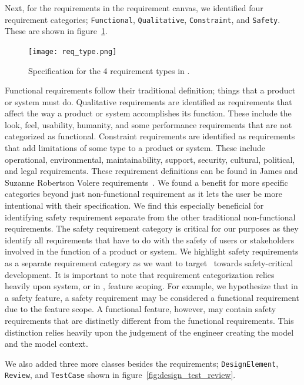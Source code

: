 Next, for the requirements in the requirement canvas, we identified four requirement categories; \texttt{Functional}, \texttt{Qualitative}, \texttt{Constraint}, and \texttt{Safety}. These are shown in figure~\ref{fig:req_type}.

\begin{figure}[hbt!]
	\centering
	\texttt{[image: req\_type.png]}
	\caption{Specification for the 4 requirement types in \tool.}
	\label{fig:req_type}
\end{figure}

Functional requirements follow their traditional definition; things that a product or system must do. Qualitative requirements are identified as requirements that affect the way a product or system accomplishes its function. These include the look, feel, usability, humanity, and some performance requirements that are not categorized as functional. Constraint requirements are identified as requirements that add limitations of some type to a product or system. These include operational, environmental, maintainability, support, security, cultural, political, and legal requirements. These requirement definitions can be found in James and Suzanne Robertson Volere requirements~\cite{robertson2000volere}. We found a benefit for more specific categories beyond just non-functional requirement as it lets the user be more intentional with their specification. We find this especially beneficial for identifying safety requirement separate from the other traditional non-functional requirements. The safety requirement category is critical for our purposes as they identify all requirements that have to do with the safety of users or stakeholders involved in the function of a product or system. We highlight safety requirements as a separate requirement category as we want to target \tool\ towards safety-critical development. It is important to note that requirement categorization relies heavily upon system, or in \tool, feature scoping. For example, we hypothesize that in a safety feature, a safety requirement may be considered a functional requirement due to the feature scope. A functional feature, however, may contain safety requirements that are distinctly different from the functional requirements. This distinction relies heavily upon the judgement of the engineer creating the model and the model context.

We also added three more classes besides the requirements; \texttt{DesignElement}, \texttt{Review}, and \texttt{TestCase} shown in figure~\ref{fig:design_test_review}. 

